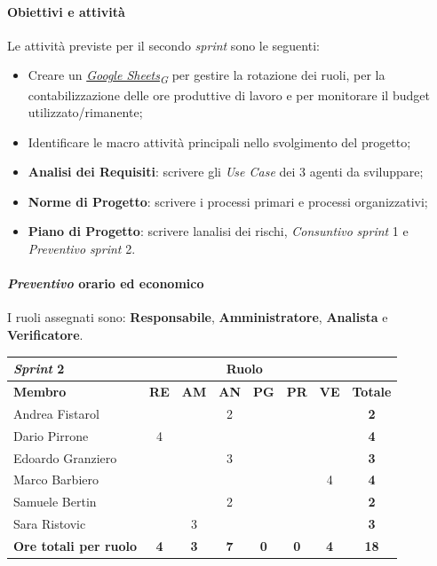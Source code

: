 \documentclass[12pt, a4paper]{article}
\newcommand{\urlglossario}{https://skynetunigroup.github.io/Code_Guardian/Documentazione/PB/glossario_v2.0.0.pdf} %
\newcommand{\glo}[2]{\href{\urlglossario\#nameddest=#2}{#1\textsubscript{G}}}
\begin{document}
{\paragraph{Obiettivi e attività}

Le attività previste per il secondo \textit{sprint} sono le seguenti:

\begin{itemize}
\item
  Creare un \textit{\glo{Google Sheets}{google-sheets}} per gestire la rotazione dei ruoli, per
  la contabilizzazione delle ore produttive di lavoro e per monitorare
  il budget utilizzato/rimanente;
\item
  Identificare le macro attività principali nello svolgimento del
  progetto;
\item
  \textbf{Analisi dei Requisiti}: scrivere gli \textit{Use Case} dei 3
  agenti da sviluppare;
\item
  \textbf{Norme di Progetto}: scrivere i processi primari e processi
  organizzativi;
\item
  \textbf{Piano di Progetto}: scrivere l\textquotesingle analisi dei
  rischi, \textit{Consuntivo} \textit{sprint} 1 e \textit{Preventivo} \textit{sprint} 2.
\end{itemize}

\paragraph{\textit{Preventivo} orario ed economico}

I ruoli assegnati sono: \textbf{Responsabile}, \textbf{Amministratore}, \textbf{Analista} e \textbf{Verificatore}.
\begin{table}[H]
    \centering
    \renewcommand{\arraystretch}{1.3}
    \begin{tabularx}{0.9\textwidth}{|X|c|c|c|c|c|c|c|}
        \hline
        \textbf{\textit{Sprint} 2} & \multicolumn{6}{|c|}{\textbf{Ruolo}} & \\ \hline
        \textbf{Membro} & \textbf{RE} & \textbf{AM} & \textbf{AN} &
        \textbf{PG} & \textbf{PR} & \textbf{VE} & \textbf{Totale} \\ \hline
        Andrea Fistarol & & & 2 & & & &\textbf{2} \\ \hline
        Dario Pirrone & 4 & & & & & &\textbf{4} \\ \hline
        Edoardo Granziero & & & 3 & & & &\textbf{3} \\ \hline
        Marco Barbiero & & & & & & 4 &\textbf{4} \\ \hline
        Samuele Bertin & & & 2 & & & &\textbf{2} \\ \hline
        Sara Ristovic & & 3 & & & & &\textbf{3} \\ \hline
        \textbf{Ore totali per ruolo} & \textbf{4} & \textbf{3} &
        \textbf{7} & \textbf{0} & \textbf{0} & \textbf{4} & \textbf{18}\\ \hline
 

\end{tabularx}
\end{table}}
\end{document}
